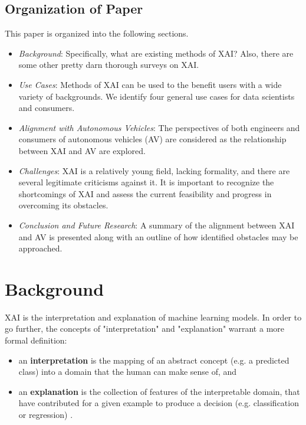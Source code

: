 \documentclass{IEEEtran}
\begin{document}
\subsection{Organization of Paper}

This paper is organized into the following sections.

\begin{itemize}
    \item\textit{Background}: Specifically, what are existing methods of XAI?  Also, there are some other pretty darn thorough surveys on XAI.

    \item\textit{Use Cases}: Methods of XAI can be used to the benefit users with a wide variety of backgrounds.  We identify four general use cases for data scientists and consumers.

    \item\textit{Alignment with Autonomous Vehicles}: The perspectives of both engineers and consumers of autonomous vehicles (AV) are considered as the relationship between XAI and AV are explored.

    \item\textit{Challenges}: XAI is a relatively young field, lacking formality, and there are several legitimate criticisms against it.  It is important to recognize the shortcomings of XAI and assess the current feasibility and progress in overcoming its obstacles.

    \item\textit{Conclusion and Future Research}: A summary of the alignment between XAI and AV is presented along with an outline of how identified obstacles may be approached.
\end{itemize}

\section{Background}

XAI is the interpretation and explanation of machine learning models.  In order to go further, the concepts of "interpretation" and "explanation" warrant a more formal definition:

\begin{itemize}
    \item an \textbf{interpretation} is the mapping of an abstract concept (e.g. a predicted class) into a domain that the human can make sense of, and
    \item an \textbf{explanation} is the collection of features of the interpretable domain, that have contributed for a given example to produce a decision (e.g. classification or regression) \cite{MONTAVON20181}.
\end{itemize}
\end{document}
